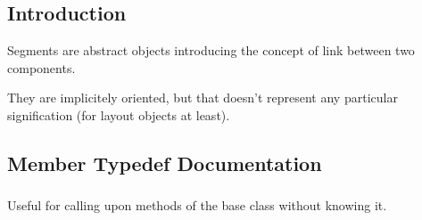 \hypertarget{classHurricane_1_1Segment_secSegmentIntro}{}\subsection{Introduction}\label{classHurricane_1_1Segment_secSegmentIntro}
Segments are abstract objects introducing the concept of link between two components.

They are implicitely oriented, but that doesn't represent any particular signification (for layout objects at least). 

\subsection{Member Typedef Documentation}
\hypertarget{classHurricane_1_1Segment_a2f616ba119bb6e9751659814bdbf0320}{
\subsubsection[{Inherit}]{}}\label{classHurricane_1_1Segment_a2f616ba119bb6e9751659814bdbf0320}
Useful for calling upon methods of the base class without knowing it. 

